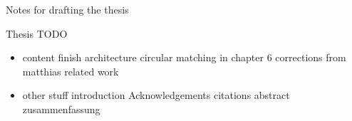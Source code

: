 \clearemptydoublepage

{}

\begin{center}
	\huge{Notes for drafting the thesis}
\end{center}


Thesis TODO
\begin{itemize}
\item content
\subitem finish architecture
\subitem circular matching in chapter 6
\subitem corrections from matthias
\subitem related work
\item other stuff
\subitem introduction
\subitem Acknowledgements
\subitem citations
\subitem abstract
\subitem zusammenfassung
\end{itemize}
